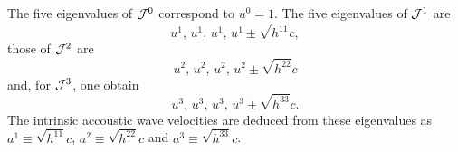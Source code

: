 \documentclass[12pt]{article}
\begin{document}
The five eigenvalues of ${\cal J}^0$ correspond to $u^0=1$. The five eigenvalues of ${\cal J}^1$ are
\begin{equation}\label{eq:eig_flux1}
u^1, \, u^1, \,u^1, \,u^1 \pm \sqrt{h^{11}} c,
\end{equation}
those of ${\cal J}^2$ are
\begin{equation}\label{eq:eig_flux2}
u^2, \, u^2, \, u^2, \, u^2 \pm \sqrt{h^{22}} c
\end{equation}
and, for ${\cal J}^3$, one obtain
\begin{equation}\label{eq:eig_flux3}
u^3, \, u^3, \, u^3, \, u^3 \pm \sqrt{h^{33}} c.
\end{equation}
The intrinsic accoustic wave velocities are deduced from these eigenvalues as $a^1 \equiv \sqrt{h^{11}} c$, $a^2 \equiv \sqrt{h^{22}} c$ and $a^3 \equiv \sqrt{h^{33}} c$.
\end{document}
